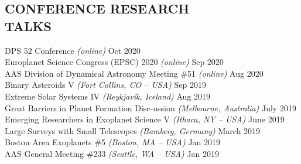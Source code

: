 \documentclass[margin]{res}
\begin{document}
\begin{resume}
\section{\normalfont CONFERENCE RESEARCH \\TALKS}
DPS 52 Conference \textit{(online)} \hfill Oct 2020 \\
Europlanet Science Congress (EPSC) 2020 \textit{(online)} \hfill Sep 2020 \\
AAS Division of Dynamical Astronomy Meeting \#51 \textit{(online)} \hfill Aug 2020 \\
Binary Asteroids V \textit{(Fort Collins, CO -- USA)} \hfill Sep 2019 \\
Extreme Solar Systems IV \textit{(Reykjav\'{i}k, Iceland)} \hfill Aug 2019 \\
Great Barriers in Planet Formation Disc-ussion \textit{(Melbourne, Australia)} \hfill July 2019 \\
Emerging Researchers in Exoplanet Science V \textit{(Ithaca, NY -- USA)} \hfill June 2019 \\
Large Surveys with Small Telescopes \textit{(Bamberg, Germany)} \hfill March 2019 \\ 
Boston Area Exoplanets \#5 \textit{(Boston, MA -- USA)} \hfill Jan 2019 \\
AAS General Meeting \#233 \textit{(Seattle, WA -- USA)} \hfill Jan 2019


\end{resume}
\end{document}
